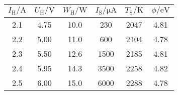 \label{tab:tabSTA}
	\begin{tabular}{S[table-format=1.1]S[table-format=1.2]S[table-format=2.1]S[table-format=4.0]S[table-format=3.0]S[table-format=1.2]}
		\toprule
		{$I_\text{H}/\si{\ampere}$} & {$U_\text{H}/\si{\volt}$} & {$W_\text{H}/\si{\watt}$} & {$I_\text{S}/\si{\micro\ampere}$} & {$T_\text{S}/\si{\kelvin}$} & {$\phi/\si{\electronvolt}$} \\
		 & 4.75 & 10.0 &  230 & 2047 & 4.81 \\
		2.2 & 5.00 & 11.0 &  600 & 2104 & 4.78 \\
		2.3 & 5.50 & 12.6 & 1500 & 2185 & 4.81 \\
		2.4 & 5.95 & 14.3 & 3500 & 2258 & 4.82 \\
		2.5 & 6.00 & 15.0 & 6000 & 2288 & 4.78 \\
		\bottomrule
	\end{tabular}
